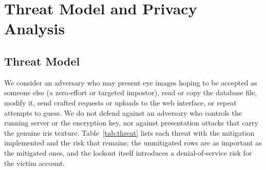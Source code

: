\documentclass[conference]{IEEEtran}
\begin{document}
\section{Threat Model and Privacy Analysis}
\subsection{Threat Model}
We consider an adversary who may present eye images hoping to be accepted as someone else (a zero-effort or targeted impostor), read or copy the database file, modify it, send crafted requests or uploads to the web interface, or repeat attempts to guess. We do not defend against an adversary who controls the running server or the encryption key, nor against presentation attacks that carry the genuine iris texture. Table~\ref{tab:threat} lists each threat with the mitigation implemented and the risk that remains; the unmitigated rows are as important as the mitigated ones, and the lockout itself introduces a denial-of-service risk for the victim account.
\end{document}
